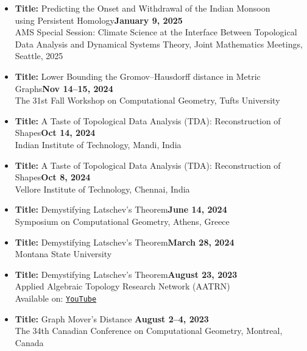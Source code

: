 \documentclass[11pt]{article}
\begin{document}
\begin{itemize}[leftmargin=*]
  \item \textbf{Title:} Predicting the Onset and Withdrawal of the Indian Monsoon\\ using Persistent Homology\hfill  \textbf{\footnotesize January 9, 2025}\\
  AMS Special Session: Climate Science at the Interface Between Topological Data Analysis and Dynamical Systems Theory,
  Joint Mathematics Meetings, Seattle, 2025 

  \item \textbf{Title:} Lower Bounding the Gromov--Hausdorff distance in Metric Graphs\hfill  \textbf{\footnotesize Nov 14--15, 2024}\\
  The 31st Fall Workshop on Computational Geometry, Tufts University

  \item \textbf{Title:} A Taste of Topological Data Analysis (TDA): Reconstruction of Shapes\hfill  \textbf{\footnotesize Oct 14, 2024}\\
  Indian Institute of Technology, Mandi, India

  \item \textbf{Title:} A Taste of Topological Data Analysis (TDA): Reconstruction of Shapes\hfill  \textbf{\footnotesize Oct 8, 2024}\\
  Vellore Institute of Technology, Chennai, India

  \item \textbf{Title:} Demystifying Latschev's Theorem\hfill  \textbf{\footnotesize June 14, 2024}\\
  Symposium on Computational Geometry, Athens, Greece
  
  \item \textbf{Title:} Demystifying Latschev's Theorem\hfill  \textbf{\footnotesize March 28, 2024}\\
  Montana State University

  \item \textbf{Title:} Demystifying Latschev's Theorem\hfill  \textbf{\footnotesize August 23, 2023}\\
  Applied Algebraic Topology Research Network (AATRN)\\
  Available on: \href{https://www.youtube.com/watch?v=bSFkxlYc4P0}{\tt YouTube}

  \item \textbf{Title:} Graph Mover's Distance
  \hfill  \textbf{\footnotesize August 2--4, 2023} \\
  The 34th Canadian Conference on Computational Geometry, Montreal, Canada
 

\end{itemize}
\end{document}
